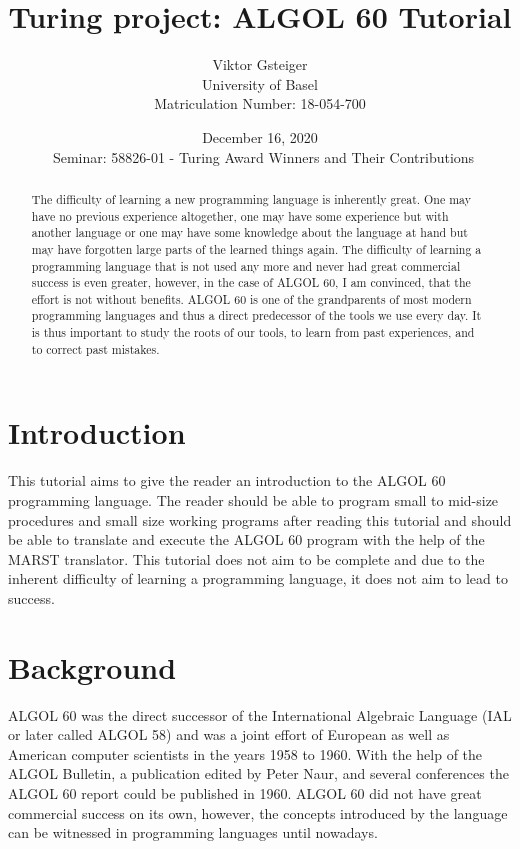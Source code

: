 \documentclass{article}
\author{Viktor Gsteiger \\ University of Basel \\ Matriculation Number: 18-054-700}
\title{Turing project: ALGOL 60 Tutorial}
\date{December 16, 2020 \\\ Seminar: 58826-01 - Turing Award Winners and Their Contributions}
\begin{document}
\maketitle

\begin{abstract}
	The difficulty of learning a new programming language is inherently great. One may have no previous experience altogether, one may have some experience but with another language or one may have some knowledge about the language at hand but may have forgotten large parts of the learned things again. The difficulty of learning a programming language that is not used any more and never had great commercial success is even greater, however, in the case of ALGOL 60, I am convinced, that the effort is not without benefits. ALGOL 60 is one of the grandparents of most modern programming languages and thus a direct predecessor of the tools we use every day. It is thus important to study the roots of our tools, to learn from past experiences, and to correct past mistakes.
\end{abstract}

\newpage

\tableofcontents

\newpage

\section{Introduction}
This tutorial aims to give the reader an introduction to the ALGOL 60 programming language. The reader should be able to program small to mid-size procedures and small size working programs after reading this tutorial and should be able to translate and execute the ALGOL 60 program with the help of the MARST translator. This tutorial does not aim to be complete and due to the inherent difficulty of learning a programming language, it does not aim to lead to success.

\section{Background}
ALGOL 60 was the direct successor of the International Algebraic Language (IAL or later called ALGOL 58) and was a joint effort of European as well as American computer scientists in the years 1958 to 1960. With the help of the ALGOL Bulletin, a publication edited by Peter Naur, and several conferences the ALGOL 60 report could be published in 1960. ALGOL 60 did not have great commercial success on its own, however, the concepts introduced by the language can be witnessed in programming languages until nowadays.
\end{document}
